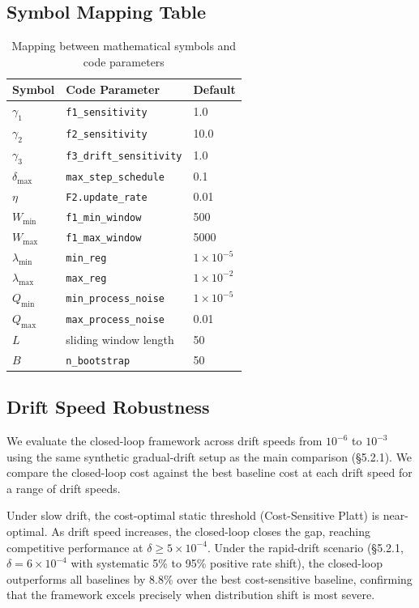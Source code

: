 \documentclass[12pt,a4paper]{article}
\begin{document}
\subsection{Symbol Mapping Table}

\begin{table}[h]
\centering
\caption{Mapping between mathematical symbols and code parameters}
\label{tab:symbol_map}
\begin{tabular}{lll}
\toprule
Symbol & Code Parameter & Default \\
\midrule
$\gamma_1$ & \texttt{f1\_sensitivity} & 1.0 \\
$\gamma_2$ & \texttt{f2\_sensitivity} & 10.0 \\
$\gamma_3$ & \texttt{f3\_drift\_sensitivity} & 1.0 \\
$\delta_{\max}$ & \texttt{max\_step\_schedule} & 0.1 \\
$\eta$ & \texttt{F2.update\_rate} & 0.01 \\
$W_{\min}$ & \texttt{f1\_min\_window} & 500 \\
$W_{\max}$ & \texttt{f1\_max\_window} & 5000 \\
$\lambda_{\min}$ & \texttt{min\_reg} & $1\times10^{-5}$ \\
$\lambda_{\max}$ & \texttt{max\_reg} & $1\times10^{-2}$ \\
$Q_{\min}$ & \texttt{min\_process\_noise} & $1\times10^{-5}$ \\
$Q_{\max}$ & \texttt{max\_process\_noise} & 0.01 \\
$L$ & sliding window length & 50 \\
$B$ & \texttt{n\_bootstrap} & 50 \\
\bottomrule
\end{tabular}
\end{table}


\subsection{Drift Speed Robustness}

We evaluate the closed-loop framework across drift speeds from $10^{-6}$ to $10^{-3}$
using the same synthetic gradual-drift setup as the main comparison (\S5.2.1).
We compare the closed-loop cost against the best baseline cost
at each drift speed for a range of drift speeds.

Under slow drift, the cost-optimal static threshold (Cost-Sensitive Platt) is near-optimal.
As drift speed increases, the closed-loop closes the gap, reaching competitive performance
at $\delta \geq 5 \times 10^{-4}$. Under the rapid-drift scenario (\S5.2.1, $\delta=6\times10^{-4}$
with systematic 5\% to 95\% positive rate shift), the closed-loop outperforms all baselines
by 8.8\% over the best cost-sensitive baseline, confirming that the framework excels precisely
when distribution shift is most severe.
\end{document}
